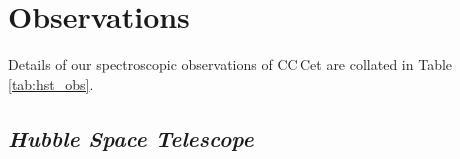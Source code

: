 \documentclass[fleqn,usenatbib]{mnras}
\newcommand{\bgc}[1]{\textcolor{orange}{[#1]}}
\begin{document}

 

\section{Observations}
\label{sec:obs}
Details of our spectroscopic observations of CC\,Cet are collated in Table \ref{tab:hst_obs}.

\subsection{\textit{Hubble Space Telescope}}
\end{document}
